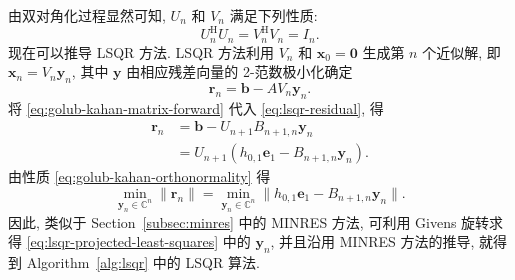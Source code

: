 {由双对角化过程显然可知, $U_n$ 和 $V_n$ 满足下列性质:}
\begin{equation}\label{eq:golub-kahan-orthonormality}U_n^{\mathrm H}U_n=V_n^{\mathrm H}V_n=I_n.\end{equation}
{现在可以推导 LSQR 方法. LSQR 方法利用 $V_n$ 和 $\bm x_0=\bm0$ 生成第 $n$ 个近似解, 即 $\bm x_n=V_n\bm y_n$, 其中 $\bm y$ 由相应残差向量的 2-范数极小化确定}
\begin{equation}\label{eq:lsqr-residual}\bm r_n=\bm b-AV_n\bm y_n.\end{equation}
{将 \eqref{eq:golub-kahan-matrix-forward} 代入 \eqref{eq:lsqr-residual}, 得}
\[\begin{aligned}\bm r_n&=\bm b-U_{n+1}B_{n+1,n}\bm y_n\\&=U_{n+1}(h_{0,1}\bm e_1-B_{n+1,n}\bm y_n).\end{aligned}\]
{由性质 \eqref{eq:golub-kahan-orthonormality} 得}
\begin{equation}\label{eq:lsqr-projected-least-squares}\min_{\bm y_n\in\mathbb C^n}\|\bm r_n\|=\min_{\bm y_n\in\mathbb C^n}\|h_{0,1}\bm e_1-B_{n+1,n}\bm y_n\|.\end{equation}
{因此, 类似于 Section\ \ref{subsec:minres} 中的 MINRES 方法, 可利用 Givens 旋转求得 \eqref{eq:lsqr-projected-least-squares} 中的 $\bm y_n$, 并且沿用 MINRES 方法的推导, 就得到 Algorithm\ \ref{alg:lsqr} 中的 LSQR 算法.}
